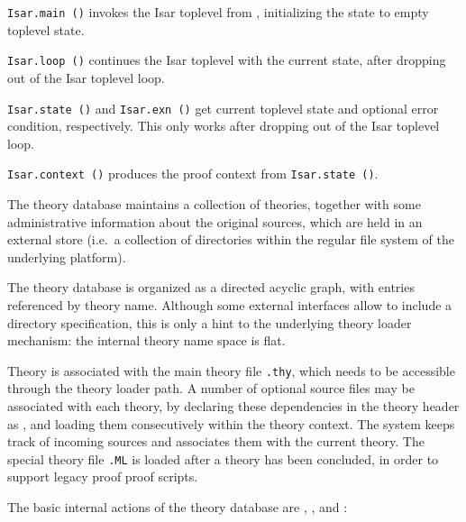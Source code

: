 \begin{isabellebody}
\begin{isamarkuptext}
  \begin{description}

  \item \verb|Isar.main ()| invokes the Isar toplevel from {\ML},
  initializing the state to empty toplevel state.

  \item \verb|Isar.loop ()| continues the Isar toplevel with the
  current state, after dropping out of the Isar toplevel loop.

  \item \verb|Isar.state ()| and \verb|Isar.exn ()| get current
  toplevel state and optional error condition, respectively.  This
  only works after dropping out of the Isar toplevel loop.

  \item \verb|Isar.context ()| produces the proof context from \verb|Isar.state ()|.

  \end{description}%
\end{isamarkuptext}%
\isamarkuptrue%
%
\endisatagmlref
{\isafoldmlref}%
%
\isadelimmlref
%
\endisadelimmlref
%
\isamarkuptrue%
%
\begin{isamarkuptext}%
The theory database maintains a collection of theories,
  together with some administrative information about the original
  sources, which are held in an external store (i.e.\ a collection of
  directories within the regular file system of the underlying
  platform).

  The theory database is organized as a directed acyclic graph, with
  entries referenced by theory name.  Although some external
  interfaces allow to include a directory specification, this is only
  a hint to the underlying theory loader mechanism: the internal
  theory name space is flat.

  Theory  is associated with the main theory file \verb,.thy,, which needs to be accessible through the theory
  loader path.  A number of optional {\ML} source files may be
  associated with each theory, by declaring these dependencies in the
  theory header as \isa{{\isasymUSES}}, and loading them consecutively
  within the theory context.  The system keeps track of incoming {\ML}
  sources and associates them with the current theory.  The special
  theory {\ML} file \verb,.ML, is loaded after a theory has
  been concluded, in order to support legacy proof {\ML} proof
  scripts.

  The basic internal actions of the theory database are , , and :


\end{isamarkuptext}
\end{isabellebody}
